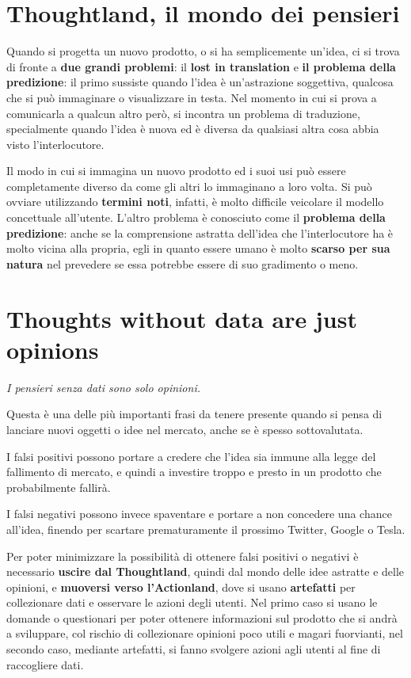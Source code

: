 \documentclass[a4paper,11pt,oneside]{book}
\begin{document}
\section{Thoughtland, il mondo dei pensieri}
Quando si progetta un nuovo prodotto, o si ha semplicemente un'idea, ci si trova di fronte a \textbf{due grandi problemi}: il \textbf{lost in translation} e \textbf{il problema della predizione}: il primo sussiste quando l'idea è un'astrazione soggettiva, qualcosa che si può immaginare o visualizzare in testa. Nel momento in cui si prova a comunicarla a qualcun altro però, si incontra un problema
di traduzione, specialmente quando l'idea è nuova ed è diversa da qualsiasi altra cosa
abbia visto l'interlocutore.

Il modo in cui si immagina un nuovo prodotto ed i suoi usi può essere completamente diverso da come gli altri lo immaginano a loro volta. Si può ovviare utilizzando \textbf{termini noti}, infatti, è molto difficile veicolare il modello concettuale all'utente. L'altro problema è conosciuto come il \textbf{problema della predizione}: anche se la comprensione astratta dell'idea che l'interlocutore ha è molto vicina alla propria, egli in quanto essere umano è molto \textbf{scarso per sua natura} nel prevedere se essa potrebbe essere di suo gradimento o meno.

\pagebreak

\section{Thoughts without data are just opinions}

\begin{flushleft}
	\textit{I pensieri senza dati sono solo opinioni.}
\end{flushleft}

Questa è una delle più importanti frasi da tenere presente quando si pensa di lanciare nuovi oggetti o idee nel mercato, anche se è spesso sottovalutata.

I falsi positivi possono portare a credere che l'idea sia immune alla legge del
fallimento di mercato, e quindi a investire troppo e presto in un prodotto che probabilmente fallirà.

I falsi negativi possono invece spaventare e portare a non concedere una chance all'idea, finendo per scartare prematuramente il prossimo Twitter, Google o Tesla.

Per poter minimizzare la possibilità di ottenere falsi positivi o negativi è necessario \textbf{uscire dal Thoughtland}, quindi dal mondo delle idee astratte e delle opinioni, e \textbf{muoversi verso l'Actionland}, dove si usano \textbf{artefatti} per collezionare dati e osservare le azioni degli utenti. Nel primo caso si usano le domande o questionari per poter ottenere informazioni sul prodotto
che si andrà a sviluppare, col rischio di collezionare opinioni poco utili e magari fuorvianti, nel secondo caso, mediante artefatti, si fanno svolgere azioni agli utenti al fine di raccogliere dati.
\end{document}
